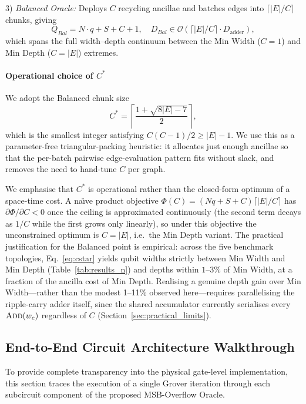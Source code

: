 \documentclass{ieeeaccess}
\begin{document}
3) \emph{Balanced Oracle:} Deploys $C$ recycling ancillae and batches edges into $\lceil |E|/C \rceil$ chunks, giving
\begin{equation}
Q_{Bal} = N \cdot q + S + C + 1, \quad D_{Bal} \in \mathcal{O}(\lceil |E|/C \rceil \cdot D_{\text{adder}}),
\end{equation}
which spans the full width--depth continuum between the Min Width ($C{=}1$) and Min Depth ($C{=}|E|$) extremes.

\paragraph{Operational choice of $C^*$}
We adopt the Balanced chunk size
\begin{equation}
C^* = \left\lceil \frac{1 + \sqrt{8|E| - 7}}{2} \right\rceil,
\label{eq:cstar}
\end{equation}
which is the smallest integer satisfying $C(C-1)/2 \ge |E|-1$. We use this as a parameter-free triangular-packing heuristic: it allocates just enough ancillae so that the per-batch pairwise edge-evaluation pattern fits without slack, and removes the need to hand-tune $C$ per graph.

We emphasise that $C^*$ is operational rather than the closed-form optimum of a space-time cost. A na\"\i ve product objective $\Phi(C) = (Nq + S + C) \lceil |E|/C \rceil$ has $\partial\Phi/\partial C < 0$ once the ceiling is approximated continuously (the second term decays as $1/C$ while the first grows only linearly), so under this objective the unconstrained optimum is $C = |E|$, i.e.\ the Min Depth variant. The practical justification for the Balanced point is empirical: across the five benchmark topologies, Eq.~\eqref{eq:cstar} yields qubit widths strictly between Min Width and Min Depth (Table~\ref{tab:results_n}) and depths within $1$--$3\%$ of Min Width, at a fraction of the ancilla cost of Min Depth. Realising a genuine depth gain over Min Width---rather than the modest 1--11\% observed here---requires parallelising the ripple-carry adder itself, since the shared accumulator currently serialises every $\textsc{Add}(w_e)$ regardless of $C$ (Section~\ref{sec:practical_limits}).

\subsection{End-to-End Circuit Architecture Walkthrough}
\label{sec:walkthrough}
To provide complete transparency into the physical gate-level implementation, this section traces the execution of a single Grover iteration through each subcircuit component of the proposed MSB-Overflow Oracle.
\end{document}
